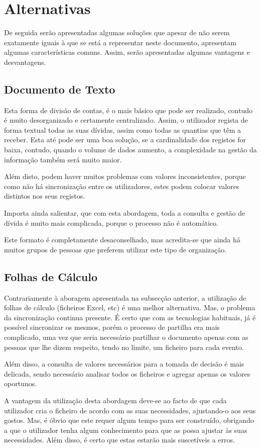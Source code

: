 \section{Alternativas}

De seguida serão apresentadas algumas soluções que apesar de não serem exatamente iguais à que se está a representar neste documento, apresentam algumas características comuns. Assim, serão apresentadas algumas vantagens e desvantagens.

\subsection{Documento de Texto}

Esta forma de divisão de contas, é o mais básico que pode ser realizado, contudo é muito desorganizado e certamente centralizado. Assim, o utilizador regista de forma textual todas as suas dívidas, assim como todas as quantias que têm a receber. Esta até pode ser uma boa solução, se a cardinalidade dos registos for baixa, contudo, quando o volume de dados aumento, a complexidade na gestão da informação também será muito maior.

Além disto, podem haver muitos problemas com valores inconsistentes, porque como não há sincronização entre os utilizadores, estes podem colocar valores distintos nos seus registos.

Importa ainda salientar, que com esta abordagem, toda a consulta e gestão de dívida é muito mais complicada, porque o processo não é automático.

Este formato é completamente desaconselhado, mas acredita-se que ainda há muitos grupos de pessoas que preferem utilizar este tipo de organização.

\subsection{Folhas de Cálculo}

Contrariamente à aboragem apresentada na subsecção anterior, a utilização de folhas de cálculo (ficheiros Excel, etc) é uma melhor alternativa. Mas, o problema da sincronização continua presente. É certo que com as tecnologias habituais, já é possível sincronizar os mesmos, porém o processo de partilha era mais complicado, uma vez que seria necessário partilhar o documento apenas com as pessoas que lhe dizem respeito, tendo no limite, um ficheiro para cada evento.

Além disso, a consulta de valores necessários para a tomada de decisão é mais delicada, sendo necessário analisar todos os ficheiros e agregar apenas os valores oportunos.

A vantagem da utilização desta abordagem deve-se ao facto de que cada utilizador cria o ficheiro de acordo com as suas necessidades, ajustando-o aos seus gostos. Mas, é óbvio que este requer algum tempo para ser construído, obrigando a que o utilizador tenha algum conhecimento para que as possa ajustar às suas necessidades. Além disso, é certo que estas estarão mais suscetíveis a erros.